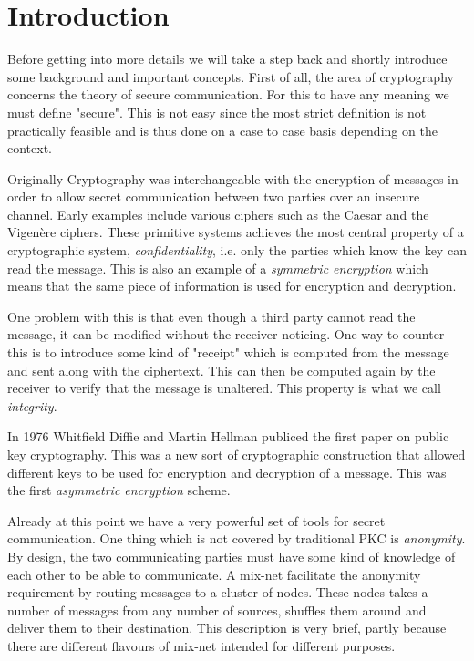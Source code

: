 \section{Introduction}



Before getting into more details we will take a step back and shortly introduce some background and important concepts. First of all, the area of cryptography concerns the theory of secure communication. For this to have any meaning we must define "secure". This is not easy since the most strict definition is not practically feasible and is thus done on a case to case basis depending on the context.

Originally Cryptography was interchangeable with the encryption of messages in order to allow secret communication between two parties over an insecure channel. Early examples include various ciphers such as the Caesar and the Vigenère ciphers. These primitive systems achieves the most central property of a cryptographic system, \emph{confidentiality}, i.e. only the parties which know the key can read the message. This is also an example of a \emph{symmetric encryption} which means that the same piece of information is used for encryption and decryption.

One problem with this is that even though a third party cannot read the message, it can be modified without the receiver noticing. One way to counter this is to introduce some kind of "receipt" which is computed from the message and sent along with the ciphertext. This can then be computed again by the receiver to verify that the message is unaltered. This property is what we call \emph{integrity}.

In 1976 Whitfield Diffie and Martin Hellman publiced the first paper on public key cryptography. This was a new sort of cryptographic construction that allowed different keys to be used for encryption and decryption of a message. This was the first \emph{asymmetric encryption} scheme.

Already at this point we have a very powerful set of tools for secret communication. One thing which is not covered by traditional PKC is \emph{anonymity}. By design, the two communicating parties must have some kind of knowledge of each other to be able to communicate. A mix-net facilitate the anonymity requirement by routing messages to a cluster of nodes. These nodes takes a number of messages from any number of sources, shuffles them around and deliver them to their destination. This description is very brief, partly because there are different flavours of mix-net intended for different purposes.

